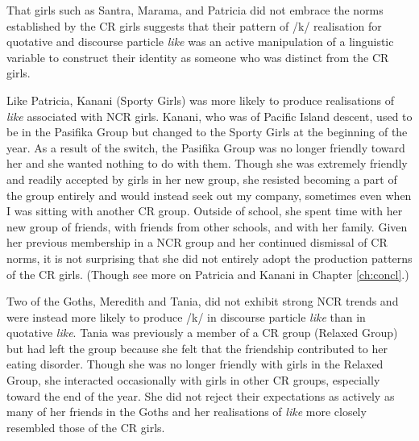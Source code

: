  

That girls such as Santra, Marama, and Patricia did not embrace the norms established by the CR girls suggests that their pattern of /k/ realisation for quotative and discourse particle \textit{like} was an active manipulation of a linguistic variable to construct their identity as someone who was distinct from the CR girls.

Like Patricia, Kanani (Sporty Girls) was more likely to produce realisations of \textit{like} associated with NCR girls.  Kanani, who was of Pacific Island descent, used to be in the Pasifika Group but changed to the Sporty Girls at the beginning of the year.  As a result of the switch, the Pasifika Group was no longer friendly toward her and she wanted nothing to do with them.  Though she was extremely friendly and readily accepted by girls in her new group, she resisted becoming a part of the group entirely and would instead seek out my company, sometimes even when I was sitting with another CR group.  Outside of school, she spent time with her new group of friends, with friends from other schools, and with her family.  Given her previous membership in a NCR group and her continued dismissal of CR norms, it is not surprising that she did not entirely adopt the production patterns of the CR girls. (Though see more on Patricia and Kanani in Chapter \ref{ch:concl}.)

Two of the Goths, Meredith and Tania, did not exhibit strong NCR trends and were instead more likely to produce /k/ in discourse particle \textit{like} than in quotative \textit{like}.  Tania was previously a member of a CR group (Relaxed Group) but had left the group because she felt that the friendship contributed to her eating disorder.  Though she was no longer friendly with girls in the Relaxed Group, she interacted occasionally with girls in other CR groups, especially toward the end of the year.  She did not reject their expectations as actively as many of her friends in the Goths and her realisations of \textit{like} more closely resembled those of the CR girls.  


